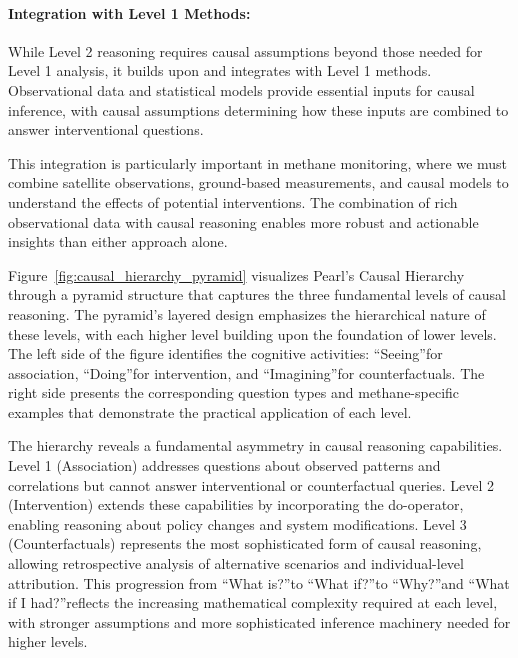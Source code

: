 \paragraph{Integration with Level 1 Methods:}

While Level 2 reasoning requires causal assumptions beyond those needed for Level 1 analysis, it builds upon and integrates with Level 1 methods. Observational data and statistical models provide essential inputs for causal inference, with causal assumptions determining how these inputs are combined to answer interventional questions.

This integration is particularly important in methane monitoring, where we must combine satellite observations, ground-based measurements, and causal models to understand the effects of potential interventions. The combination of rich observational data with causal reasoning enables more robust and actionable insights than either approach alone.

Figure~\ref{fig:causal_hierarchy_pyramid} visualizes Pearl's Causal Hierarchy through a pyramid structure that captures the three fundamental levels of causal reasoning. The pyramid's layered design emphasizes the hierarchical nature of these levels, with each higher level building upon the foundation of lower levels. The left side of the figure identifies the cognitive activities: \textquotedblleft Seeing\textquotedblright for association, \textquotedblleft Doing\textquotedblright for intervention, and \textquotedblleft Imagining\textquotedblright for counterfactuals. The right side presents the corresponding question types and methane-specific examples that demonstrate the practical application of each level.

The hierarchy reveals a fundamental asymmetry in causal reasoning capabilities. Level 1 (Association) addresses questions about observed patterns and correlations but cannot answer interventional or counterfactual queries. Level 2 (Intervention) extends these capabilities by incorporating the do-operator, enabling reasoning about policy changes and system modifications. Level 3 (Counterfactuals) represents the most sophisticated form of causal reasoning, allowing retrospective analysis of alternative scenarios and individual-level attribution. This progression from \textquotedblleft What is?\textquotedblright to \textquotedblleft What if?\textquotedblright to \textquotedblleft Why?\textquotedblright and \textquotedblleft What if I had?\textquotedblright reflects the increasing mathematical complexity required at each level, with stronger assumptions and more sophisticated inference machinery needed for higher levels.

